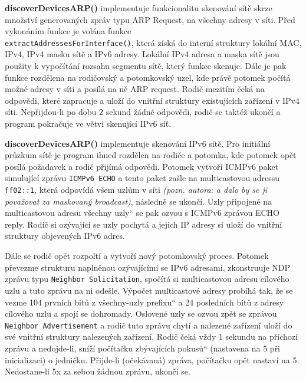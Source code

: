\documentclass[a4paper, 11pt]{article}
\providecommand{\uv}[1]{\quotedblbase #1\textquotedblleft}
\begin{document}
	\par{\textbf{discoverDevicesARP()} implementuje funkcionalitu skenování sítě skrze množství generovaných zpráv typu ARP Request, na všechny adresy v síti. Před vykonáním funkce je volána funkce \\ \texttt{extractAddressesForInterface()}, která získá do interní struktury lokální MAC, IPv4, IPv4 masku sítě a IPv6 adresy. Lokální IPv4 adresa a maska sítě jsou použity k vypočítání rozsahu segmentu sítě, který funkce skenuje. Dále je pak funkce rozdělena na rodičovský a potomkovský uzel, kde právě potomek počítá možné adresy v síti a posílá na ně ARP request. Rodič mezitím čeká na odpovědi, které zapracuje a uloží do vnitřní struktury existujících zařízení v IPv4 síti. Nepřijdou-li po dobu 2 sekund žádné odpovědi, rodič se taktéž ukončí a program pokračuje ve větvi skenující IPv6 síť.}

	\par{\textbf{discoverDevicesARP()} implementuje skenování IPv6 sítě. Pro initiální průzkum sítě je program ihned rozdělen na rodiče a potomka, kde potomek opět posílá požadavek a rodič přijímá odpovědi. Potomek vytvoří ICMPv6 paket simulující zprávu \texttt{ICMPv6 ECHO} a tento paket zašle na multicastovou adressu \texttt{ff02::1}, která odpovídá všem uzlům v síti \textit{(pozn. autora: a dalo by se ji považovat za maskovaný broadcast)}, následně se ukončí. Uzly připojené na multicastovou adresu \uv{všechny uzly} se pak ozvou s ICMPv6 zprávou ECHO reply. Rodič si ozývající se uzly pochytá a jejich IP adresy si uloží do vnitřní struktury objevených IPv6 adres.}

	\par{Dále se rodič opět rozpoltí a vytvoří nový potomkovský proces. Potomek převezme strukturu naplněnou ozývajícími se IPv6 adresami, zkonstruuje NDP zprávu typu \texttt{Neighbor Solicitation}, spočítá si multicastovou adresu cílového uzlu a tuto zprávu na ni odešle. Výpočet multicastové adresy probíhá tak, že se vezme 104 prvních bitů z \uv{všechny-uzly prefixu} a 24 posledních bitů z adresy cílového uzlu a spojí se dohromady. Oslovené uzly se ozvou zpět se zprávou \texttt{Neighbor Advertisement} a rodič tuto zprávu chytí a nalezené zařízení uloží do své vnitřní struktury nalezených zařízení. Rodič čeká vždy 1 sekundu na příchozí zprávu a nedojde-li, sníží počítačku \uv{zbývajících pokusů} (nastavena na 5 při inicializaci) o jedničku. Přijde-li (očekávaná) zpráva, počítačku opět nastaví na 5. Nedostane-li 5x za sebou žádnou zprávu, ukončí se.}
\end{document}

